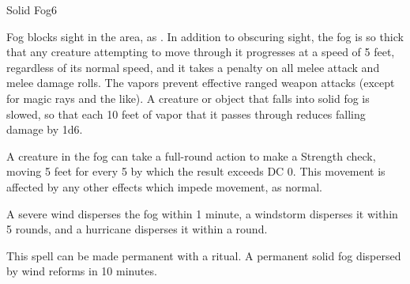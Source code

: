 \begin{spellsection}{Solid Fog}{6}
\begin{spellheader}
    \begin{spelltargetinginfo}
    \end{spelltargetinginfo}
\end{spellheader}
\begin{spellcontent}
    \begin{spelleffects}
        \spelleffect Fog blocks sight in the area, as . In addition to obscuring sight, the fog is so thick that any creature attempting to move through it progresses at a speed of 5 feet, regardless of its normal speed, and it takes a  penalty on all melee attack and melee damage rolls. The vapors prevent effective ranged weapon attacks (except for magic rays and the like). A creature or object that falls into solid fog is slowed, so that each 10 feet of vapor that it passes through reduces falling damage by 1d6.
        \par A creature in the fog can take a full-round action to make a Strength check, moving 5 feet for every 5 by which the result exceeds DC 0. This movement is affected by any other effects which impede movement, as normal.
        \spelldur \durshort
    \end{spelleffects}
\end{spellcontent}
\begin{spellfooter}
    \spellnotes \fogspellnotes A severe wind disperses the fog within 1 minute, a windstorm disperses it within 5 rounds, and a hurricane disperses it within a round.

    \physicalspellnotes

    This spell can be made permanent with a  ritual. A permanent solid fog dispersed by wind reforms in 10 minutes.
\end{spellfooter}
\end{spellsection}

